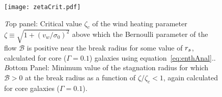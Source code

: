 \begin{figure}
\texttt{[image: zetaCrit.pdf]}
\caption{\label{fig:zetaCrit} {\emph Top panel:} Critical value $\zeta_c$ of the wind heating parameter
  $\zeta \equiv \sqrt{1+(v_w/\sigma_0)^2}$ above which the Bernoulli parameter of the flow $\mathcal{B}$ is positive near the break radius for some value of $r_s$, calculated for core ($\Gamma=0.1$)
  galaxies using equation~\eqref{eq:enthAnal}.. {\emph Bottom Panel:} Minimum value of the stagnation radius for which $\mathcal{B} > 0$ at the break radius as a function of $\zeta/\zeta_c < 1$, again calculated for core galaxies ($\Gamma=0.1$).}
\end{figure}


